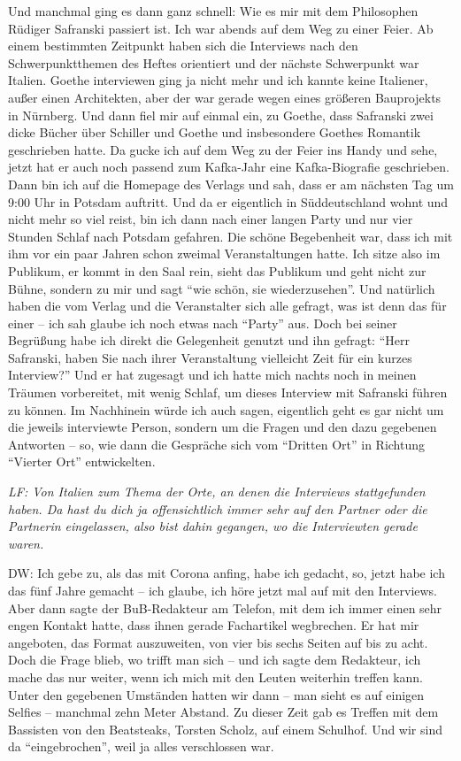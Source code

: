 \documentclass[a4paper,
fontsize=11pt,
oneside,
numbers=noperiodatend,
parskip=half-,
bibliography=totoc,
final
]{scrartcl}
\begin{document}
Und manchmal ging es dann ganz schnell: Wie es mir mit dem Philosophen
Rüdiger Safranski passiert ist. Ich war abends auf dem Weg zu einer
Feier. Ab einem bestimmten Zeitpunkt haben sich die Interviews nach den
Schwerpunktthemen des Heftes orientiert und der nächste Schwerpunkt war
Italien. Goethe interviewen ging ja nicht mehr und ich kannte keine
Italiener, außer einen Architekten, aber der war gerade wegen eines
größeren Bauprojekts in Nürnberg. Und dann fiel mir auf einmal ein, zu
Goethe, dass Safranski zwei dicke Bücher über Schiller und Goethe und
insbesondere Goethes Romantik geschrieben hatte. Da gucke ich auf dem
Weg zu der Feier ins Handy und sehe, jetzt hat er auch noch passend zum
Kafka-Jahr eine Kafka-Biografie geschrieben. Dann bin ich auf die
Homepage des Verlags und sah, dass er am nächsten Tag um 9:00 Uhr in
Potsdam auftritt. Und da er eigentlich in Süddeutschland wohnt und nicht
mehr so viel reist, bin ich dann nach einer langen Party und nur vier
Stunden Schlaf nach Potsdam gefahren. Die schöne Begebenheit war, dass
ich mit ihm vor ein paar Jahren schon zweimal Veranstaltungen hatte. Ich
sitze also im Publikum, er kommt in den Saal rein, sieht das Publikum
und geht nicht zur Bühne, sondern zu mir und sagt \enquote{wie schön,
sie wiederzusehen}. Und natürlich haben die vom Verlag und die
Veranstalter sich alle gefragt, was ist denn das für einer -- ich sah
glaube ich noch etwas nach \enquote{Party} aus. Doch bei seiner
Begrüßung habe ich direkt die Gelegenheit genutzt und ihn gefragt:
\enquote{Herr Safranski, haben Sie nach ihrer Veranstaltung vielleicht
Zeit für ein kurzes Interview?} Und er hat zugesagt und ich hatte mich
nachts noch in meinen Träumen vorbereitet, mit wenig Schlaf, um dieses
Interview mit Safranski führen zu können. Im Nachhinein würde ich auch
sagen, eigentlich geht es gar nicht um die jeweils interviewte Person,
sondern um die Fragen und den dazu gegebenen Antworten -- so, wie dann
die Gespräche sich vom \enquote{Dritten Ort} in Richtung
\enquote{Vierter Ort} entwickelten.

\emph{LF: Von Italien zum Thema der Orte, an denen die Interviews
stattgefunden haben. Da hast du dich ja offensichtlich immer sehr auf
den Partner oder die Partnerin eingelassen, also bist dahin gegangen, wo
die Interviewten gerade waren.}

DW: Ich gebe zu, als das mit Corona anfing, habe ich gedacht, so, jetzt
habe ich das fünf Jahre gemacht -- ich glaube, ich höre jetzt mal auf
mit den Interviews. Aber dann sagte der BuB-Redakteur am Telefon, mit
dem ich immer einen sehr engen Kontakt hatte, dass ihnen gerade
Fachartikel wegbrechen. Er hat mir angeboten, das Format auszuweiten,
von vier bis sechs Seiten auf bis zu acht. Doch die Frage blieb, wo
trifft man sich -- und ich sagte dem Redakteur, ich mache das nur
weiter, wenn ich mich mit den Leuten weiterhin treffen kann. Unter den
gegebenen Umständen hatten wir dann -- man sieht es auf einigen Selfies
-- manchmal zehn Meter Abstand. Zu dieser Zeit gab es Treffen mit dem
Bassisten von den Beatsteaks, Torsten Scholz, auf einem Schulhof. Und
wir sind da \enquote{eingebrochen}, weil ja alles verschlossen war.
\end{document}

